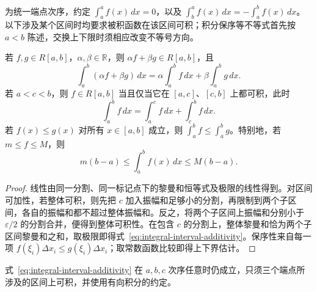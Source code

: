为统一端点次序，约定 $\int_a^a f(x)\,dx=0$，以及 $\int_b^a f(x)\,dx=-\int_a^b f(x)\,dx$。以下涉及某个区间时均要求被积函数在该区间可积；积分保序等不等式首先按 $a<b$ 陈述，交换上下限时须相应改变不等号方向。

\begin{theorem}[线性、区间可加性与保序性]
\label{thm:basic-properties-riemann-integral}
若 $f,g\in R[a,b]$，$\alpha,\beta\in\mathbb R$，则 $\alpha f+\beta g\in R[a,b]$，且
\begin{equation}
    \int_a^b(\alpha f+\beta g)\,dx
    =\alpha\int_a^b f\,dx+\beta\int_a^b g\,dx.
    \label{eq:integral-linearity}
\end{equation}
若 $a<c<b$，则 $f\in R[a,b]$ 当且仅当它在 $[a,c]$、$[c,b]$ 上都可积，此时
\begin{equation}
    \int_a^b f\,dx=\int_a^c f\,dx+\int_c^b f\,dx.
    \label{eq:integral-interval-additivity}
\end{equation}
若 $f(x)\leq g(x)$ 对所有 $x\in[a,b]$ 成立，则 $\int_a^b f\leq\int_a^b g$。特别地，若 $m\leq f\leq M$，则
\begin{equation}
    m(b-a)\leq\int_a^b f(x)\,dx\leq M(b-a).
    \label{eq:integral-bounds}
\end{equation}
\end{theorem}
\begin{proof}
线性由同一分割、同一标记点下的黎曼和恒等式及极限的线性得到。对区间可加性，若整体可积，则先把 $c$ 加入振幅和足够小的分割，再限制到两个子区间，各自的振幅和都不超过整体振幅和。反之，将两个子区间上振幅和分别小于 $\varepsilon/2$ 的分割合并，便得到整体可积性。在包含 $c$ 的分割上，整体黎曼和恰为两个子区间黎曼和之和，取极限即得式~\eqref{eq:integral-interval-additivity}。保序性来自每一项 $f(\xi_i)\Delta x_i\leq g(\xi_i)\Delta x_i$；取常数函数比较即得上下界估计。
\end{proof}

式~\eqref{eq:integral-interval-additivity} 在 $a,b,c$ 次序任意时仍成立，只须三个端点所涉及的区间上可积，并使用有向积分的约定。

